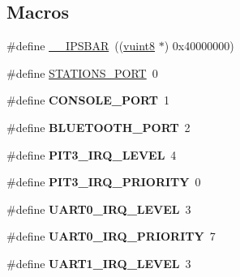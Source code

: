 \subsection*{Macros}
\begin{DoxyCompactItemize}
\item 
\#define \mbox{\hyperlink{group__RTEMSBSPsM68kMCF5225X_gabdb86768904e30373b5aa4cf02a915b6}{\+\_\+\+\_\+\+I\+P\+S\+B\+AR}}~((\mbox{\hyperlink{group__RTEMSBSPsM68kMCF5329_gab2208c2cec6d83509a16c4b4e177bc20}{vuint8}} $\ast$) 0x40000000)
\item 
\#define \mbox{\hyperlink{group__RTEMSBSPsM68kMCF5225X_ga809b0470c05eb0ec3f54947b8d217341}{S\+T\+A\+T\+I\+O\+N\+S\+\_\+\+P\+O\+RT}}~0
\item 
\mbox{\label{group__RTEMSBSPsM68kMCF5225X_ga0859abd84f64f7f09ad95a4079b06f41}} 
\#define {\bfseries C\+O\+N\+S\+O\+L\+E\+\_\+\+P\+O\+RT}~1
\item 
\mbox{\label{group__RTEMSBSPsM68kMCF5225X_gab692bdcbb025f8eeb01298116c6b9277}} 
\#define {\bfseries B\+L\+U\+E\+T\+O\+O\+T\+H\+\_\+\+P\+O\+RT}~2
\item 
\mbox{\label{group__RTEMSBSPsM68kMCF5225X_ga70573852241aab02cc64e2c8745cd24f}} 
\#define {\bfseries P\+I\+T3\+\_\+\+I\+R\+Q\+\_\+\+L\+E\+V\+EL}~4
\item 
\mbox{\label{group__RTEMSBSPsM68kMCF5225X_ga5aa390a01c2fd3849f575eeec819ac4a}} 
\#define {\bfseries P\+I\+T3\+\_\+\+I\+R\+Q\+\_\+\+P\+R\+I\+O\+R\+I\+TY}~0
\item 
\mbox{\label{group__RTEMSBSPsM68kMCF5225X_ga3f6403d98a553ab7e5246ace59655611}} 
\#define {\bfseries U\+A\+R\+T0\+\_\+\+I\+R\+Q\+\_\+\+L\+E\+V\+EL}~3
\item 
\mbox{\label{group__RTEMSBSPsM68kMCF5225X_ga421617dbbfc69fbbe3e88835e4c26dc5}} 
\#define {\bfseries U\+A\+R\+T0\+\_\+\+I\+R\+Q\+\_\+\+P\+R\+I\+O\+R\+I\+TY}~7
\item 
\mbox{\label{group__RTEMSBSPsM68kMCF5225X_ga8db7b2e20155ab9adf447660e92010b1}} 
\#define {\bfseries U\+A\+R\+T1\+\_\+\+I\+R\+Q\+\_\+\+L\+E\+V\+EL}~3

\end{DoxyCompactItemize}
